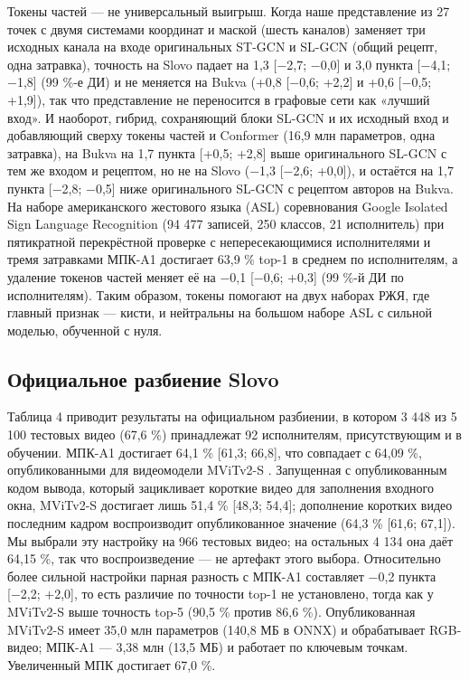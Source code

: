Токены частей --- не универсальный выигрыш. Когда наше представление из 27 точек с двумя системами координат и маской (шесть каналов) заменяет три исходных канала на входе оригинальных ST-GCN и SL-GCN (общий рецепт, одна затравка), точность на Slovo падает на 1,3 {[}−2,7; −0,0{]} и 3,0 пункта {[}−4,1; −1,8{]} (99 \%-е ДИ) и не меняется на Bukva (+0,8 {[}−0,6; +2,2{]} и +0,6 {[}−0,5; +1,9{]}), так что представление не переносится в графовые сети как «лучший вход». И наоборот, гибрид, сохраняющий блоки SL-GCN и их исходный вход и добавляющий сверху токены частей и Conformer (16,9 млн параметров, одна затравка), на Bukva на 1,7 пункта {[}+0,5; +2,8{]} выше оригинального SL-GCN с тем же входом и рецептом, но не на Slovo (−1,3 {[}−2,6; +0,0{]}), и остаётся на 1,7 пункта {[}−2,8; −0,5{]} ниже оригинального SL-GCN с рецептом авторов на Bukva. На наборе американского жестового языка (ASL) соревнования Google Isolated Sign Language Recognition \citep{2023_kaggle_gislr} (94 477 записей, 250 классов, 21 исполнитель) при пятикратной перекрёстной проверке с непересекающимися исполнителями и тремя затравками МПК-A1 достигает 63,9 \% top-1 в среднем по исполнителям, а удаление токенов частей меняет её на −0,1 {[}−0,6; +0,3{]} (99 \%-й ДИ по исполнителям). Таким образом, токены помогают на двух наборах РЖЯ, где главный признак --- кисти, и нейтральны на большом наборе ASL с сильной моделью, обученной с нуля.

\hypertarget{ux43eux444ux438ux446ux438ux430ux43bux44cux43dux43eux435-ux440ux430ux437ux431ux438ux435ux43dux438ux435-slovo}{%
\subsection{Официальное разбиение Slovo}\label{ux43eux444ux438ux446ux438ux430ux43bux44cux43dux43eux435-ux440ux430ux437ux431ux438ux435ux43dux438ux435-slovo}}

Таблица 4 приводит результаты на официальном разбиении, в котором 3 448 из 5 100 тестовых видео (67,6 \%) принадлежат 92 исполнителям, присутствующим и в обучении. МПК-A1 достигает 64,1 \% {[}61,3; 66,8{]}, что совпадает с 64,09 \%, опубликованными для видеомодели MViTv2-S \citep{2023_kapitanov_slovo}. Запущенная с опубликованным кодом вывода, который зацикливает короткие видео для заполнения входного окна, MViTv2-S достигает лишь 51,4 \% {[}48,3; 54,4{]}; дополнение коротких видео последним кадром воспроизводит опубликованное значение (64,3 \% {[}61,6; 67,1{]}). Мы выбрали эту настройку на 966 тестовых видео; на остальных 4 134 она даёт 64,15 \%, так что воспроизведение --- не артефакт этого выбора. Относительно более сильной настройки парная разность с МПК-A1 составляет −0,2 пункта {[}−2,2; +2,0{]}, то есть различие по точности top-1 не установлено, тогда как у MViTv2-S выше точность top-5 (90,5 \% против 86,6 \%). Опубликованная MViTv2-S имеет 35,0 млн параметров (140,8 МБ в ONNX) и обрабатывает RGB-видео; МПК-A1 --- 3,38 млн (13,5 МБ) и работает по ключевым точкам. Увеличенный МПК достигает 67,0 \%.

